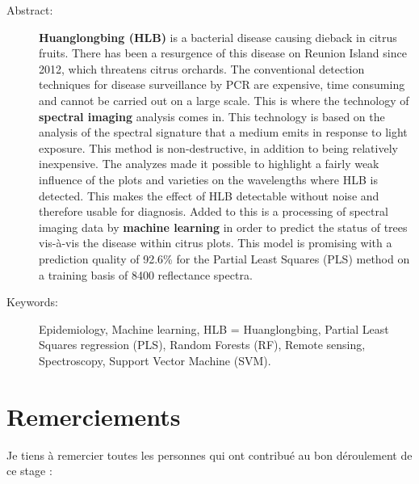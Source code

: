 \documentclass[
  11pt,
  french,
  a4paper,
  extrafontsizes,onecolumn,openright
  ]{memoir}
\begin{document}
\begin{description}
\item[Abstract:]
\textbf{Huanglongbing (HLB)} is a bacterial disease causing dieback in citrus fruits. There has been a resurgence of this disease on Reunion Island since 2012, which threatens citrus orchards. The conventional detection techniques for disease surveillance by PCR are expensive, time consuming and cannot be carried out on a large scale. This is where the technology of \textbf{spectral imaging} analysis comes in. This technology is based on the analysis of the spectral signature that a medium emits in response to light exposure. This method is non-destructive, in addition to being relatively inexpensive. The analyzes made it possible to highlight a fairly weak influence of the plots and varieties on the wavelengths where HLB is detected. This makes the effect of HLB detectable without noise and therefore usable for diagnosis. Added to this is a processing of spectral imaging data by \textbf{machine learning} in order to predict the status of trees vis-à-vis the disease within citrus plots. This model is promising with a prediction quality of 92.6\% for the Partial Least Squares (PLS) method on a training basis of 8400 reflectance spectra.

\item[Keywords:]
Epidemiology, Machine learning, HLB = Huanglongbing, Partial Least Squares regression (PLS), Random Forests (RF), Remote sensing, Spectroscopy, Support Vector Machine (SVM).

\cleardoublepage
\end{description}








\LargeMargins
{
\hypersetup{linkcolor=}
\setcounter{tocdepth}{3}
\tableofcontents
}



\LargeMargins
\hypertarget{remerciements}{%
\chapter*{Remerciements}\label{remerciements}}

Je tiens à remercier toutes les personnes qui ont contribué au bon déroulement de ce stage :
\end{document}
